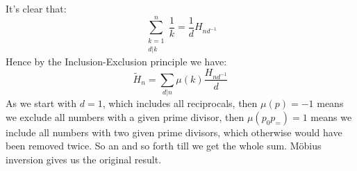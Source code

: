It's clear that:
\[\sum_{\substack{k=1\\d|k}}^n\frac{1}{k}=\frac{1}{d}H_{nd^{-1}}\]
Hence by the Inclusion-Exclusion principle we have:
\[\tilde{H}_n = \sum_{d|n}\mu(k)\frac{H_{nd^{-1}}}{d}\]
As we start with $d=1$,
which includes all reciprocals,
then $\mu(p)=-1$ means we exclude all numbers with a given prime divisor,
then $\mu(p_0p_=)=1$ means we include all numbers with two given prime divisors,
which otherwise would have been removed twice.
So an and so forth till we get the whole sum.
Möbius inversion gives us the original result.
